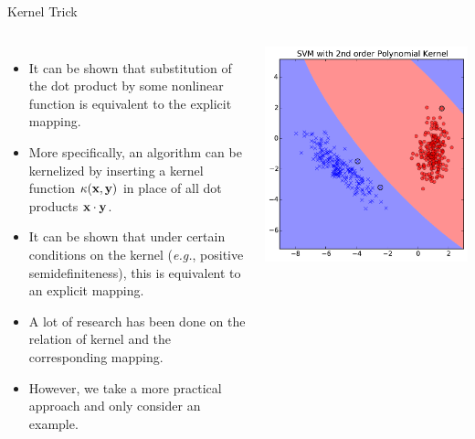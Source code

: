\documentclass[10pt, aspectratio=169]{beamer} %
\newcommand{\x}{{\bf x}}
\newcommand{\y}{{\bf y}}
\begin{document}
\begin{frame}[fragile,allowframebreaks=0.8]
 {Kernel Trick}
\begin{columns}[onlytextwidth]
\begin{itemize}
\item It can be shown that substitution of the dot product by some nonlinear
function is equivalent to the explicit mapping.
\item More specifically, an algorithm can be kernelized by inserting
a kernel function $\kappa(\x,\y)$ in place of all dot products
$\x \cdot \y$.
\item It can be shown that under certain conditions on the kernel (\textit{e.g.}, positive semidefiniteness),
this is equivalent to an explicit mapping.
\item A lot of research has been done on the relation of kernel and the corresponding mapping.
\item However, we take a more practical approach and only consider an example.
\end{itemize}
\includegraphics[width=\columnwidth]{SVM_boundary_poly2.pdf}\\

\end{columns}
\end{frame}
\end{document}
